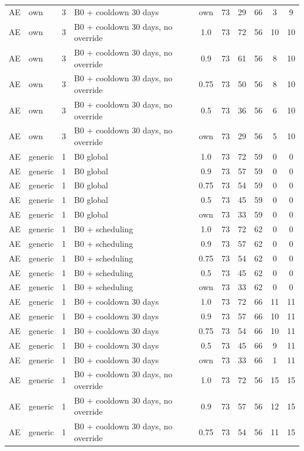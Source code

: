 \begin{longtable}{lllp{4.4cm}cccccc}
AE & own & 3 & B0 + cooldown 30 days & own & 73 & 29 & 66 & 3 & 9 \\
AE & own & 3 & B0 + cooldown 30 days, no override & 1.0 & 73 & 72 & 56 & 10 & 10 \\
AE & own & 3 & B0 + cooldown 30 days, no override & 0.9 & 73 & 61 & 56 & 8 & 10 \\
AE & own & 3 & B0 + cooldown 30 days, no override & 0.75 & 73 & 50 & 56 & 8 & 10 \\
AE & own & 3 & B0 + cooldown 30 days, no override & 0.5 & 73 & 36 & 56 & 6 & 10 \\
AE & own & 3 & B0 + cooldown 30 days, no override & own & 73 & 29 & 56 & 5 & 10 \\
AE & generic & 1 & B0 global & 1.0 & 73 & 72 & 59 & 0 & 0 \\
AE & generic & 1 & B0 global & 0.9 & 73 & 57 & 59 & 0 & 0 \\
AE & generic & 1 & B0 global & 0.75 & 73 & 54 & 59 & 0 & 0 \\
AE & generic & 1 & B0 global & 0.5 & 73 & 45 & 59 & 0 & 0 \\
AE & generic & 1 & B0 global & own & 73 & 33 & 59 & 0 & 0 \\
AE & generic & 1 & B0 + scheduling & 1.0 & 73 & 72 & 62 & 0 & 0 \\
AE & generic & 1 & B0 + scheduling & 0.9 & 73 & 57 & 62 & 0 & 0 \\
AE & generic & 1 & B0 + scheduling & 0.75 & 73 & 54 & 62 & 0 & 0 \\
AE & generic & 1 & B0 + scheduling & 0.5 & 73 & 45 & 62 & 0 & 0 \\
AE & generic & 1 & B0 + scheduling & own & 73 & 33 & 62 & 0 & 0 \\
AE & generic & 1 & B0 + cooldown 30 days & 1.0 & 73 & 72 & 66 & 11 & 11 \\
AE & generic & 1 & B0 + cooldown 30 days & 0.9 & 73 & 57 & 66 & 10 & 11 \\
AE & generic & 1 & B0 + cooldown 30 days & 0.75 & 73 & 54 & 66 & 10 & 11 \\
AE & generic & 1 & B0 + cooldown 30 days & 0.5 & 73 & 45 & 66 & 9 & 11 \\
AE & generic & 1 & B0 + cooldown 30 days & own & 73 & 33 & 66 & 1 & 11 \\
AE & generic & 1 & B0 + cooldown 30 days, no override & 1.0 & 73 & 72 & 56 & 15 & 15 \\
AE & generic & 1 & B0 + cooldown 30 days, no override & 0.9 & 73 & 57 & 56 & 12 & 15 \\
AE & generic & 1 & B0 + cooldown 30 days, no override & 0.75 & 73 & 54 & 56 & 11 & 15 \\

\end{longtable}
